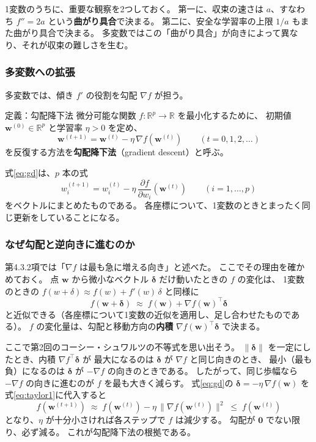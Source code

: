 1変数のうちに、重要な観察を2つしておく。
第一に、収束の速さは $a$、すなわち $f'' = 2a$ という\textbf{曲がり具合}で決まる。
第二に、安全な学習率の上限 $1/a$ もまた曲がり具合で決まる。
多変数ではこの「曲がり具合」が向きによって異なり、それが収束の難しさを生む。

\subsubsection{多変数への拡張}

多変数では、傾き $f'$ の役割を勾配 $\nabla f$ が担う。

\begin{itembox}[l]{定義：勾配降下法}
微分可能な関数 $f : \mathbb{R}^p \to \mathbb{R}$ を最小化するために、
初期値 $\bm{w}^{(0)} \in \mathbb{R}^p$ と学習率 $\eta > 0$ を定め、
\begin{equation}
  \bm{w}^{(t+1)} = \bm{w}^{(t)} - \eta\, \nabla f(\bm{w}^{(t)})
  \qquad (t = 0, 1, 2, \ldots)
  \label{eq:gd}
\end{equation}
を反復する方法を\textbf{勾配降下法}（gradient descent）と呼ぶ。
\end{itembox}

式\eqref{eq:gd}は、$p$ 本の式
\begin{equation*}
  w_i^{(t+1)} = w_i^{(t)} - \eta\, \frac{\partial f}{\partial w_i}(\bm{w}^{(t)})
  \qquad (i = 1, \ldots, p)
\end{equation*}
をベクトルにまとめたものである。
各座標について、1変数のときとまったく同じ更新をしていることになる。

\subsubsection{なぜ勾配と逆向きに進むのか}

第4.3.2項では「$\nabla f$ は最も急に増える向き」と述べた。
ここでその理由を確かめておく。
点 $\bm{w}$ から微小なベクトル $\bm{\delta}$ だけ動いたときの $f$ の変化は、
1変数のときの $f(w + \delta) \approx f(w) + f'(w)\,\delta$ と同様に
\begin{equation}
  f(\bm{w} + \bm{\delta}) \;\approx\; f(\bm{w}) + \nabla f(\bm{w})^\top \bm{\delta}
  \label{eq:taylor1}
\end{equation}
と近似できる（各座標について1変数の近似を適用し、足し合わせたものである）。
$f$ の変化量は、勾配と移動方向の\textbf{内積} $\nabla f(\bm{w})^\top\bm{\delta}$ で決まる。

ここで第2回のコーシー・シュワルツの不等式を思い出そう。
$\|\bm{\delta}\|$ を一定にしたとき、内積 $\nabla f^\top \bm{\delta}$ が
最大になるのは $\bm{\delta}$ が $\nabla f$ と同じ向きのとき、
最小（最も負）になるのは $\bm{\delta}$ が $-\nabla f$ の向きのときである。
したがって、同じ歩幅なら $-\nabla f$ の向きに進むのが
$f$ を最も大きく減らす。
式\eqref{eq:gd}の $\bm{\delta} = -\eta\,\nabla f(\bm{w})$ を式\eqref{eq:taylor1}に代入すると
\begin{equation}
  f(\bm{w}^{(t+1)}) \;\approx\; f(\bm{w}^{(t)}) - \eta\, \|\nabla f(\bm{w}^{(t)})\|^2
  \;\leq\; f(\bm{w}^{(t)})
  \label{eq:gd-decrease}
\end{equation}
となり、$\eta$ が十分小さければ各ステップで $f$ は減少する。
勾配が $\bm{0}$ でない限り、必ず減る。
これが勾配降下法の根拠である。

